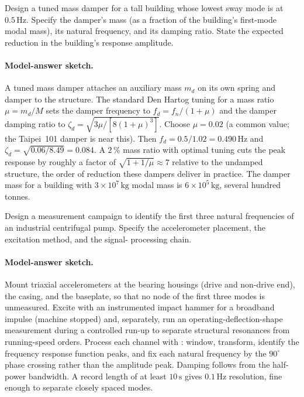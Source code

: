 \begin{exercise}
Design a tuned mass damper for a tall building whose lowest sway
mode is at $0.5\,\si{\hertz}$. Specify the damper's mass (as a
fraction of the building's first-mode modal mass), its natural
frequency, and its damping ratio. State the expected reduction in
the building's response amplitude.

\paragraph{Model-answer sketch.} A tuned mass damper attaches an
auxiliary mass $m_d$ on its own spring and damper to the structure.
The standard Den Hartog tuning for a mass ratio $\mu = m_d/M$ sets the
damper frequency to $f_d = f_n/(1 + \mu)$ and the damper damping ratio
to $\zeta_d = \sqrt{3\mu/[8(1 + \mu)^3]}$. Choose $\mu = 0.02$ (a
common value; the Taipei~101 damper is near this). Then $f_d =
0.5/1.02 = 0.490\,\si{\hertz}$ and $\zeta_d = \sqrt{0.06/8.49} =
0.084$. A $2\,\%$ mass ratio with optimal tuning cuts the peak
response by roughly a factor of $\sqrt{1 + 1/\mu} \approx 7$ relative
to the undamped structure, the order of reduction these dampers
deliver in practice. The damper mass for a building with $3\times
10^7\,\si{\kilogram}$ modal mass is $6\times 10^5\,\si{\kilogram}$,
several hundred tonnes.
\end{exercise}

\begin{exercise}
Design a measurement campaign to identify the first three natural
frequencies of an industrial centrifugal pump. Specify the
accelerometer placement, the excitation method, and the signal-
processing chain.

\paragraph{Model-answer sketch.} Mount triaxial accelerometers at the
bearing housings (drive and non-drive end), the casing, and the
baseplate, so that no node of the first three modes is unmeasured.
Excite with an instrumented impact hammer for a broadband impulse
(machine stopped) and, separately, run an operating-deflection-shape
measurement during a controlled run-up to separate structural
resonances from running-speed orders. Process each channel with
: window, transform, identify the frequency
response function peaks, and fix each natural frequency by the
$90^{\circ}$ phase crossing rather than the amplitude peak. Damping
follows from the half-power bandwidth. A record length of at least
$10\,\si{\second}$ gives $0.1\,\si{\hertz}$ resolution, fine enough to
separate closely spaced modes.
\end{exercise}


